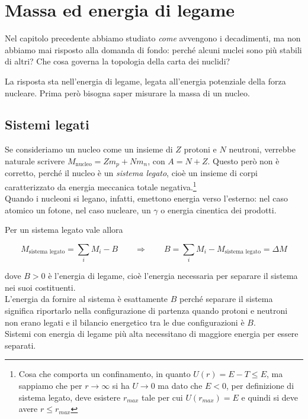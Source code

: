 \chapter{Massa ed energia di legame}

Nel capitolo precedente abbiamo studiato \emph{come} avvengono i decadimenti, ma non abbiamo mai risposto alla domanda di fondo: perché alcuni nuclei sono più stabili di altri? Che cosa governa la topologia della carta dei nuclidi? 

La risposta sta nell'energia di legame, legata all'energia potenziale della forza nucleare. Prima però bisogna saper misurare la massa di un nucleo. 

\section{Sistemi legati}

Se consideriamo un nucleo come un insieme di $Z$ protoni e $N$ neutroni, verrebbe naturale scrivere $M_{\text{nucleo}} = Z m_p + N m_n$, con $A = N + Z$. Questo però non è corretto, perché il nucleo è un \emph{sistema legato}, cioè un insieme di corpi caratterizzato da energia meccanica totale negativa.\footnote{Cosa che comporta un confinamento, in quanto $U(r) = E - T \leq E$, ma sappiamo che per $r \to \infty$ si ha $U \to 0$ ma dato che $E < 0$, per definizione di sistema legato, deve esistere $r_{max}$ tale per cui $U(r_{max}) = E$ e quindi si deve avere $r \leq r_{max}$} \\
Quando i nucleoni si legano, infatti, emettono energia verso l'esterno: nel caso atomico un fotone, nel caso nucleare, un $\gamma$ o energia cinentica dei prodotti. 

Per un sistema legato vale allora
%
\begin{tcolorbox}[colback=black!5!white, colframe=black!45!white, boxrule=0.8pt]
\begin{equation}
    M_{\text{sistema legato}} = \sum_i M_i - B \qquad \Longrightarrow \qquad B = \sum_i M_i - M_{\text{sistema legato}} = \Delta M
    \label{eq:def_B}
\end{equation}
\end{tcolorbox}
dove $B > 0$ è l'energia di legame, cioè l'energia necessaria per separare il sistema nei suoi costituenti. \\
L'energia da fornire al sistema è esattamente $B$ perché separare il sistema significa riportarlo nella configurazione di partenza quando protoni e neutroni non erano legati e il bilancio energetico tra le due configurazioni è $B$. \\
Sistemi con energia di legame più alta necessitano di maggiore energia per essere separati.

